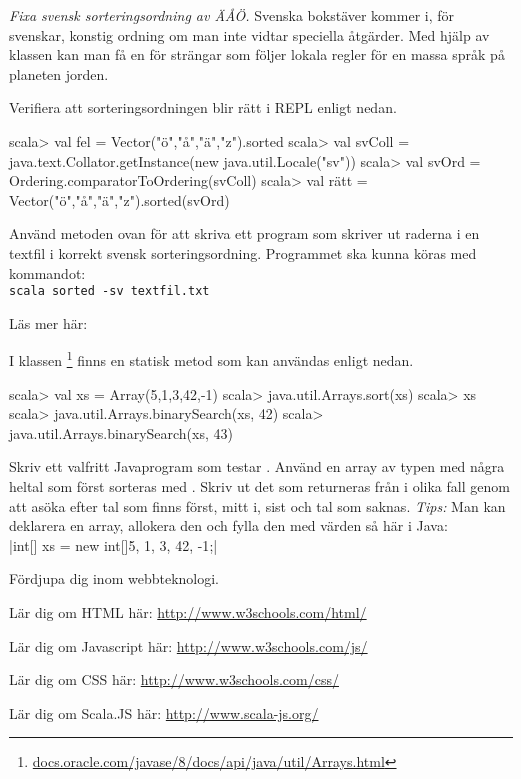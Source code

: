 \Task \label{task:swedish-letter-ordering} \emph{Fixa svensk sorteringsordning av ÄÅÖ.} Svenska bokstäver kommer i, för svenskar, konstig ordning om man inte vidtar speciella åtgärder. Med hjälp av klassen  kan man få en  för strängar som följer lokala regler för en massa språk på planeten jorden. 

\Subtask Verifiera att sorteringsordningen blir rätt i REPL enligt nedan. 

\begin{REPL}
scala> val fel = Vector("ö","å","ä","z").sorted
scala> val svColl = java.text.Collator.getInstance(new java.util.Locale("sv"))
scala> val svOrd = Ordering.comparatorToOrdering(svColl)
scala> val rätt = Vector("ö","å","ä","z").sorted(svOrd)
\end{REPL}
\Subtask Använd metoden ovan för att skriva ett program som skriver ut raderna i en textfil i korrekt svensk sorteringsordning. Programmet ska kunna köras med kommandot:\\\texttt{scala sorted -sv textfil.txt}

\Subtask Läs mer här: \\



\Task I klassen \footnote{\href{https://docs.oracle.com/javase/8/docs/api/java/util/Arrays.html}{docs.oracle.com/javase/8/docs/api/java/util/Arrays.html}} finns en statisk metod  som kan användas enligt nedan.
\begin{REPL}
scala> val xs = Array(5,1,3,42,-1)
scala> java.util.Arrays.sort(xs)
scala> xs
scala> java.util.Arrays.binarySearch(xs, 42)
scala> java.util.Arrays.binarySearch(xs, 43)
\end{REPL}
Skriv ett valfritt Javaprogram som testar . Använd en array av typen  med några heltal som först sorteras med .  Skriv ut det som returneras från    i olika fall genom att asöka efter tal som finns först, mitt i, sist och tal som saknas. 
\emph{Tips:} Man kan deklarera en array, allokera den och fylla den med värden så här i Java: \\ 
\jcode|int[] xs = new int[]{5, 1, 3, 42, -1};|


\Task Fördjupa dig inom webbteknologi. 
    
\Subtask Lär dig om HTML här: \url{http://www.w3schools.com/html/}

\Subtask Lär dig om Javascript här: \url{http://www.w3schools.com/js/}

\Subtask Lär dig om CSS här: \url{http://www.w3schools.com/css/}

\Subtask Lär dig om Scala.JS här: \url{http://www.scala-js.org/}



    